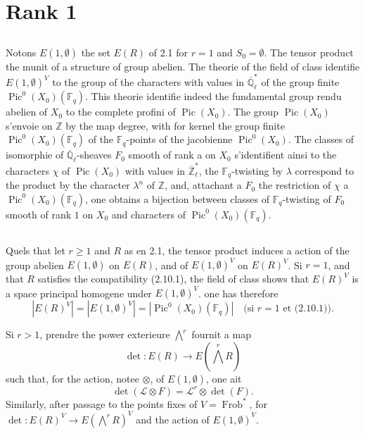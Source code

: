 \documentclass[11pt,a4paper]{article}
\theoremstyle{plain}
\theoremstyle{definition}
\DeclareMathOperator{\Pic}{Pic}
\DeclareMathOperator{\Frob}{Frob}
\newcommand{\Z}{\mathbb{Z}}
\newcommand{\F}{\mathbb{F}}
\newcommand{\Ql}{\overline{\mathbb{Q}}_\ell}
\newcommand{\Zl}{\overline{\mathbb{Z}}_\ell}
\begin{document}
\section{Rank 1}

\subsection{}
Notons $E(1, \emptyset)$ the set $E(R)$ of 2.1 for $r = 1$ and $S_0 = \emptyset$. The tensor product the munit of a structure of group abelien. The theorie of the field of class identifie $E(1, \emptyset)^V$ to the group of the characters with values in $\Ql^*$ of the group finite $\Pic^0(X_0)(\F_q)$. This theorie identifie indeed the fundamental group rendu abelien of $X_0$ to the complete profini of $\Pic(X_0)$. The group $\Pic(X_0)$ s'envoie on $\Z$ by the map degree, with for kernel the group finite $\Pic^0(X_0)(\F_q)$ of the $\F_q$-points of the jacobienne $\Pic^0(X_0)$. The classes of isomorphie of $\Ql$-sheaves $F_0$ smooth of rank a on $X_0$ s'identifient ainsi to the characters $\chi$ of $\Pic(X_0)$ with values in $\Zl^*$, the $\F_q$-twisting by $\lambda$ correspond to the product by the character $\lambda^n$ of $\Z$, and, attachant a $F_0$ the restriction of $\chi$ a $\Pic^0(X_0)(\F_q)$, one obtains a bijection between classes of $\F_q$-twisting of $F_0$ smooth of rank $1$ on $X_0$ and characters of $\Pic^0(X_0)(\F_q)$.

\subsection{}
Quels that let $r \geq 1$ and $R$ as en 2.1, the tensor product induces a action of the group abelien $E(1, \emptyset)$ on $E(R)$, and of $E(1, \emptyset)^V$ on $E(R)^V$. Si $r = 1$, and that $R$ satisfies the compatibility (2.10.1), the field of class shows that $E(R)^V$ is a space principal homogene under $E(1, \emptyset)^V$. one has therefore
\begin{equation}
|E(R)^V| = |E(1, \emptyset)^V| = |\Pic^0(X_0)(\F_q)| \quad \text{(si } r = 1 \text{ et (2.10.1))}.
\tag{6.2.1}
\end{equation}

Si $r > 1$, prendre the power exterieure $\bigwedge^r$ fournit a map
\[
\det: E(R) \longrightarrow E(\textstyle\bigwedge^r R)
\]
such that, for the action, notee $\otimes$, of $E(1, \emptyset)$, one ait
\[
\det(\mathcal{L} \otimes F) = \mathcal{L}^r \otimes \det(F).
\]
Similarly, after passage to the points fixes of $V = \Frob^*$, for $\det: E(R)^V \to E(\bigwedge^r R)^V$ and the action of $E(1, \emptyset)^V$.
\end{document}
